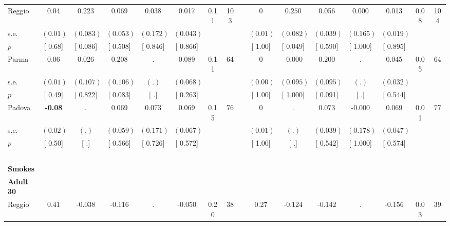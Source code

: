 \begin{longtable}{L{8em} c c c c c c c p{1em} c c c c c c c}
\quad \quad \quad Reggio& 0.04 & $ \mathbf{    0.223}$ &     0.069 &     0.038 &     0.017 &      0.11 &       103 & & 0 & $ \mathbf{    0.250}$ &     0.056 &     0.000 &     0.013 &      0.08 &       104  \\*
\quad \quad \quad \quad s.e.& $ (     0.01)$ & $ (    0.083)$ & $ (    0.053)$ & $ (    0.172)$ & $ (    0.043)$ & & & & $ (     0.01)$ & $ (    0.082)$ & $ (    0.039)$ & $ (    0.165)$ & $ (    0.019)$ & &  \\*
\quad \quad \quad \quad $ p$ & [     0.68] & [    0.086] & [    0.508] & [    0.846] & [    0.866] & & & & [     1.00] & [    0.049] & [    0.590] & [    1.000] & [    0.895] & &  \\[1em]
\quad \quad \quad Parma& 0.06 &     0.026 & $ \mathbf{    0.208}$ &         . &     0.089 &      0.11 &        64 & & 0 &    -0.000 & $ \mathbf{    0.200}$ &         . &     0.045 &      0.05 &        64  \\*
\quad \quad \quad \quad s.e.& $ (     0.01)$ & $ (    0.107)$ & $ (    0.106)$ & $ (        .)$ & $ (    0.068)$ & & & & $ (     0.00)$ & $ (    0.095)$ & $ (    0.095)$ & $ (        .)$ & $ (    0.032)$ & &  \\*
\quad \quad \quad \quad $ p$ & [     0.49] & [    0.822] & [    0.083] & [        .] & [    0.263] & & & & [     1.00] & [    1.000] & [    0.091] & [        .] & [    0.544] & &  \\[1em]
\quad \quad \quad Padova& \textbf{    -0.08} &         . &     0.069 &     0.073 &     0.069 &      0.15 &        76 & & 0 &         . &     0.073 &    -0.000 &     0.069 &      0.01 &        77  \\*
\quad \quad \quad \quad s.e.& $ (     0.02)$ & $ (        .)$ & $ (    0.059)$ & $ (    0.171)$ & $ (    0.067)$ & & & & $ (     0.01)$ & $ (        .)$ & $ (    0.039)$ & $ (    0.178)$ & $ (    0.047)$ & &  \\*
\quad \quad \quad \quad $ p$ & [     0.50] & [        .] & [    0.566] & [    0.726] & [    0.572] & & & & [     1.00] & [        .] & [    0.542] & [    1.000] & [    0.574] & &  \\[1em]
~\\[1em]
\textbf{Smokes} \\*
\quad \quad \textbf{Adult 30} & & & & & & & & & & & & & & & \\* 
\quad \quad \quad Reggio& 0.41 &    -0.038 &    -0.116 &         . &    -0.050 &      0.20 &        38 & & 0.27 &    -0.124 &    -0.142 &         . &    -0.156 &      0.03 &        39  \\*

\end{longtable}
